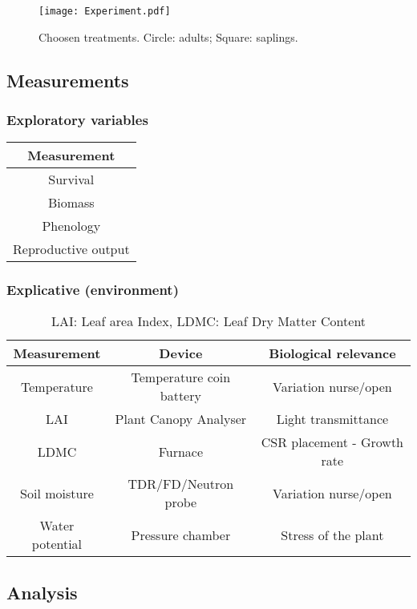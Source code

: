 \documentclass[12pt]{article} %
\begin{document}
\begin{figure} %
\begin{center}
\texttt{[image: Experiment.pdf]}
\end{center}
\caption{Choosen treatments. Circle: adults; Square: saplings. \label{exp}}
\end{figure}


\subsection{Measurements}

\subsubsection{Exploratory variables}
\begin{tabular}{c}
Measurement \\ 
\hline
Survival \\ 
Biomass \\ 
Phenology \\ 
Reproductive output \\
\hline 
\end{tabular}

\subsubsection{Explicative (environment)}
\begin{table}
\begin{center}
\begin{tabular}{ccc}
Measurement & Device & Biological relevance\\ 
\hline
Temperature & Temperature coin battery & Variation nurse/open\\ 
LAI & Plant Canopy Analyser & Light transmittance\\ 
LDMC & Furnace & CSR placement - Growth rate\\ 
Soil moisture & TDR/FD/Neutron probe & Variation nurse/open\\ 
Water potential & Pressure chamber & Stress of the plant\\ 
\hline 
\end{tabular}
\caption{LAI: Leaf area Index, LDMC: Leaf Dry Matter Content}
\end{center}
\end{table}


\subsection{Analysis}
\end{document}
